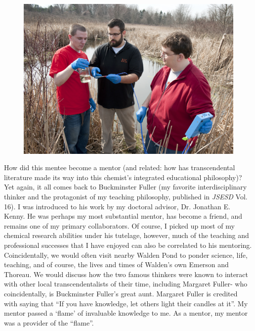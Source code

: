 \documentclass[11.5pt]{sig-alternate} %
\begin{document}
\begin{large}
\begin{figure}
    \centering
    \includegraphics[width=1\linewidth]{Pagano_WaterTest.jpg}
\end{figure}

How did this mentee become a mentor (and related: how has transcendental literature made its way into this chemist’s integrated educational philosophy)? Yet again, it all comes back to Buckminster Fuller (my favorite interdisciplinary thinker and the protagonist of my teaching philosophy, published in \textit{JSESD} Vol. 16). I was introduced to his work by my doctoral advisor, Dr. Jonathan E. Kenny. He was perhaps my most substantial mentor, has become a friend, and remains one of my primary collaborators. Of course, I picked up most of my chemical research abilities under his tutelage, however, much of the teaching and professional successes that I have enjoyed can also be correlated to his mentoring. Coincidentally, we would often visit nearby Walden Pond to ponder science, life, teaching, and of course, the lives and times of Walden’s own Emerson and Thoreau. We would discuss how the two famous thinkers were known to interact with other local transcendentalists of their time, including Margaret Fuller- who coincidentally, is Buckminster Fuller’s great aunt. Margaret Fuller is credited with saying that “If you have knowledge, let others light their candles at it”. My mentor passed a ‘flame’ of invaluable knowledge to me. As a mentor, my mentor was a provider of the “flame”.


\end{large}
\end{document}
